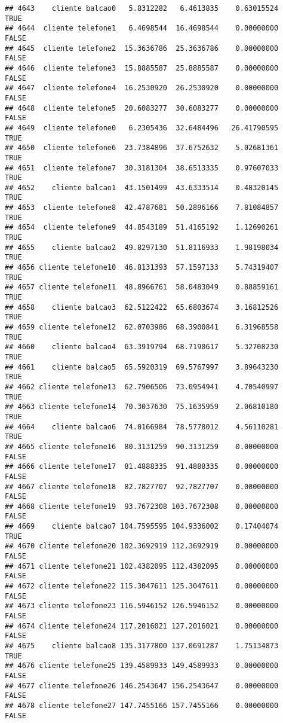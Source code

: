 \documentclass[
]{article}
\begin{document}
\begin{verbatim}
## 4643    cliente balcao0   5.8312282   6.4613835    0.63015524     TRUE
## 4644  cliente telefone1   6.4698544  16.4698544    0.00000000    FALSE
## 4645  cliente telefone2  15.3636786  25.3636786    0.00000000    FALSE
## 4646  cliente telefone3  15.8885587  25.8885587    0.00000000    FALSE
## 4647  cliente telefone4  16.2530920  26.2530920    0.00000000    FALSE
## 4648  cliente telefone5  20.6083277  30.6083277    0.00000000    FALSE
## 4649  cliente telefone0   6.2305436  32.6484496   26.41790595     TRUE
## 4650  cliente telefone6  23.7384896  37.6752632    5.02681361     TRUE
## 4651  cliente telefone7  30.3181304  38.6513335    0.97607033     TRUE
## 4652    cliente balcao1  43.1501499  43.6333514    0.48320145     TRUE
## 4653  cliente telefone8  42.4787681  50.2896166    7.81084857     TRUE
## 4654  cliente telefone9  44.8543189  51.4165192    1.12690261     TRUE
## 4655    cliente balcao2  49.8297130  51.8116933    1.98198034     TRUE
## 4656 cliente telefone10  46.8131393  57.1597133    5.74319407     TRUE
## 4657 cliente telefone11  48.8966761  58.0483049    0.88859161     TRUE
## 4658    cliente balcao3  62.5122422  65.6803674    3.16812526     TRUE
## 4659 cliente telefone12  62.0703986  68.3900841    6.31968558     TRUE
## 4660    cliente balcao4  63.3919794  68.7190617    5.32708230     TRUE
## 4661    cliente balcao5  65.5920319  69.5767997    3.89643230     TRUE
## 4662 cliente telefone13  62.7906506  73.0954941    4.70540997     TRUE
## 4663 cliente telefone14  70.3037630  75.1635959    2.06810180     TRUE
## 4664    cliente balcao6  74.0166984  78.5778012    4.56110281     TRUE
## 4665 cliente telefone16  80.3131259  90.3131259    0.00000000    FALSE
## 4666 cliente telefone17  81.4888335  91.4888335    0.00000000    FALSE
## 4667 cliente telefone18  82.7827707  92.7827707    0.00000000    FALSE
## 4668 cliente telefone19  93.7672308 103.7672308    0.00000000    FALSE
## 4669    cliente balcao7 104.7595595 104.9336002    0.17404074     TRUE
## 4670 cliente telefone20 102.3692919 112.3692919    0.00000000    FALSE
## 4671 cliente telefone21 102.4382095 112.4382095    0.00000000    FALSE
## 4672 cliente telefone22 115.3047611 125.3047611    0.00000000    FALSE
## 4673 cliente telefone23 116.5946152 126.5946152    0.00000000    FALSE
## 4674 cliente telefone24 117.2016021 127.2016021    0.00000000    FALSE
## 4675    cliente balcao8 135.3177800 137.0691287    1.75134873     TRUE
## 4676 cliente telefone25 139.4589933 149.4589933    0.00000000    FALSE
## 4677 cliente telefone26 146.2543647 156.2543647    0.00000000    FALSE
## 4678 cliente telefone27 147.7455166 157.7455166    0.00000000    FALSE

\end{verbatim}
\end{document}
